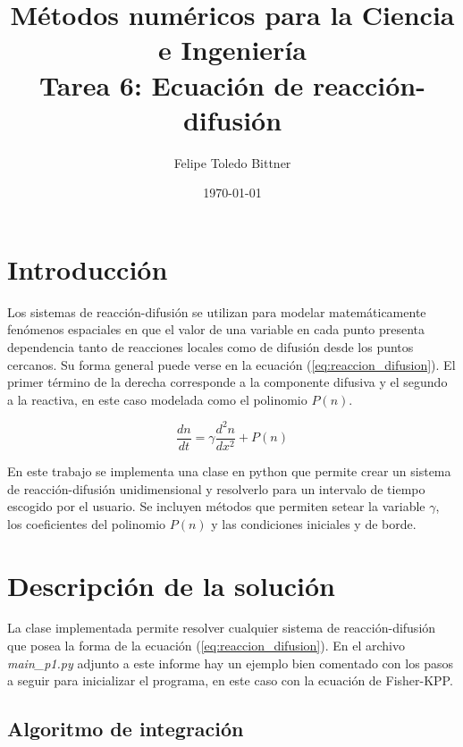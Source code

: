 \documentclass{article}
\title{M\'etodos num\'ericos para la Ciencia e Ingenier\'ia \\ Tarea 6: Ecuación de reacción-difusión} %
\author{Felipe Toledo Bittner} %
\date{\today} %
\begin{document}
\maketitle %


\section{Introducción}

Los sistemas de reacción-difusión se utilizan para modelar matemáticamente fenómenos espaciales en que el valor de una variable en cada punto presenta dependencia tanto de reacciones locales como de difusión desde los puntos cercanos. Su forma general puede verse en la ecuación (\ref{eq:reaccion_difusion}). El primer término de la derecha corresponde a la componente difusiva y el segundo a la reactiva, en este caso modelada como el polinomio $P(n)$.

\begin{equation}
  \dfrac{dn}{dt} = \gamma \dfrac{d^2n}{dx^2} + P(n)
  \label{eq:reaccion_difusion}
\end{equation}

En este trabajo se implementa una clase en python que permite crear un sistema de reacción-difusión unidimensional y resolverlo para un intervalo de tiempo escogido por el usuario. Se incluyen métodos que permiten setear la variable $\gamma$, los coeficientes del polinomio $P(n)$ y las condiciones iniciales y de borde.

\section{Descripción de la solución}

La clase implementada permite resolver cualquier sistema de reacción-difusión que posea la forma de la ecuación (\ref{eq:reaccion_difusion}). En el archivo \emph{main\_p1.py} adjunto a este informe hay un ejemplo bien comentado con los pasos a seguir para inicializar el programa, en este caso con la ecuación de Fisher-KPP.
 
\subsection{Algoritmo de integración}
\end{document}

